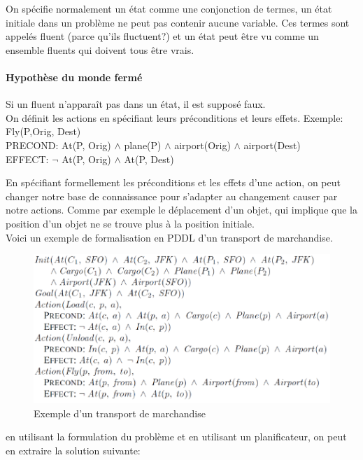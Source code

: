 \documentclass[oneside]{book}
\begin{document}
On spécifie normalement un état comme une conjonction de termes, un état initiale dans un problème ne peut pas contenir aucune variable. Ces termes sont appelés fluent (parce qu'ils fluctuent?) et un état peut être vu comme un ensemble fluents qui doivent tous être vrais.


\paragraph{Hypothèse du monde fermé} Si un fluent n'apparaît pas dans un état, il est supposé faux.\\

On définit les actions en spécifiant leurs préconditions et leurs effets. Exemple:\\

\noindent
Fly(P,Orig, Dest)\\
PRECOND: At(P, Orig) $\wedge$ plane(P) $\wedge$ airport(Orig) $\wedge$ airport(Dest)\\
EFFECT: $\neg$ At(P, Orig) $\wedge$ At(P, Dest)

En spécifiant formellement les préconditions et les effets d'une action, on peut changer notre base de connaissance pour s'adapter au changement causer par notre actions. Comme par exemple le déplacement d'un objet, qui implique que la position d'un objet ne se trouve plus à la position initiale.\\

Voici un exemple de formalisation en PDDL d'un transport de marchandise.\\
\begin{figure}[!ht]
\centering
\includegraphics[width = \linewidth]{Exemple_Transport.png}
\caption{Exemple d'un transport de marchandise}
\label{fig:Exemple_Transport}
\end{figure}

en utilisant la formulation du problème et en utilisant un planificateur, on peut en extraire la solution suivante:\\
\end{document}
